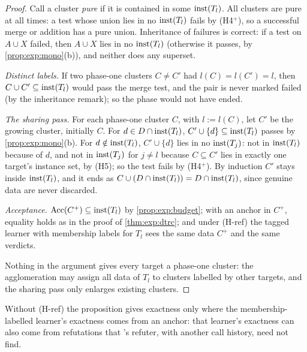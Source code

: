 \begin{proof}
Call a cluster \emph{pure} if it is contained in some $\mathrm{inst}(T_l)$. All clusters are pure at all times: a test whose union lies in no $\mathrm{inst}(T_l)$ fails by (H4$^+$), so a successful merge or addition has a pure union. Inheritance of failures is correct: if a test on $A\cup X$ failed, then $A\cup X$ lies in no $\mathrm{inst}(T_l)$ (otherwise it passes, by \cref{prop:exp:mono}(b)), and neither does any superset.

\emph{Distinct labels.} If two phase-one clusters $C\neq C'$ had $l(C)=l(C')=l$, then $C\cup C'\subseteq\mathrm{inst}(T_l)$ would pass the merge test, and the pair is never marked failed (by the inheritance remark); so the phase would not have ended.

\emph{The sharing pass.} For each phase-one cluster $C$, with $l:=l(C)$, let $C'$ be the growing cluster, initially $C$. For $d\in D\cap\mathrm{inst}(T_l)$, $C'\cup\{d\}\subseteq\mathrm{inst}(T_l)$ passes by \cref{prop:exp:mono}(b). For $d\notin\mathrm{inst}(T_l)$, $C'\cup\{d\}$ lies in no $\mathrm{inst}(T_j)$: not in $\mathrm{inst}(T_l)$ because of $d$, and not in $\mathrm{inst}(T_j)$ for $j\neq l$ because $C\subseteq C'$ lies in exactly one target's instance set, by (H5); so the test fails by (H4$^+$). By induction $C'$ stays inside $\mathrm{inst}(T_l)$, and it ends as $C\cup(D\cap\mathrm{inst}(T_l))=D\cap\mathrm{inst}(T_l)$, since genuine data are never discarded.

\emph{Acceptance.} $\mathrm{Acc}(C^+)\subseteq\mathrm{inst}(T_l)$ by \cref{prop:exp:budget}; with an anchor in $C^+$, equality holds as in the proof of \cref{thm:exp:dtrc}; and under (H-ref) the tagged learner with membership labels for $T_l$ sees the same data $C^+$ and the same verdicts.

Nothing in the argument gives every target a phase-one cluster: the agglomeration may assign all data of $T_l$ to clusters labelled by other targets, and the sharing pass only enlarges existing clusters.
\end{proof}

Without (H-ref) the proposition gives exactness only where the membership-labelled learner's exactness comes from an anchor: that learner's exactness can also come from refutations that \DTRC{}'s refuter, with another call history, need not find.

